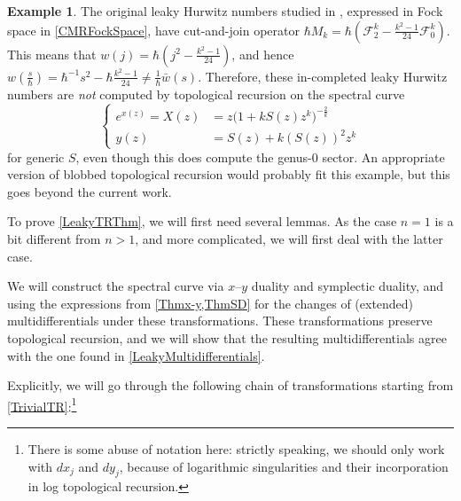 \documentclass[10pt,a4paper,oneside,no-math,reqno]{amsart}%
\theoremstyle{plain}
\theoremstyle{definition}
\newtheorem{example}[theorem]{Example}
\theoremstyle{remark}
\numberwithin{equation}{section}
\newcommand{\mc}[1]{\mathcal{#1}}
\newcommand{\1}{\mathds{1}}
\newcommand{\<}{\langle}
\renewcommand{\>}{\rangle}
\begin{document}
\begin{example}
    The original leaky Hurwitz numbers studied in \cite{CMR25}, expressed in Fock space in \cref{CMRFockSpace}, have cut-and-join operator $ \hbar M_k = \hbar (\mc{F}_2^k - \frac{k^2 - 1}{24} \mc{F}^k_0)$. This means that $ w(j) = \hbar (j^2 - \frac{k^2 -1}{24}) $, and hence $ w(\frac{s}{\hbar}) = \hbar^{-1} s^2 - \hbar \frac{k^2 -1}{24} \neq \frac{1}{\hbar} \bar{w}(s)$. Therefore, these in-completed leaky Hurwitz numbers are \emph{not} computed by topological recursion on the spectral curve
    \begin{equation}
		\begin{cases}
			e^{x(z)}
            =
            X(z)
			&=
			z \big( 1+ k S(z)z^k\big)^{-\frac{2}{k}}
			\\
			y (z)
			&=
			S(z) + k (S(z))^2 z^k
		\end{cases}
	\end{equation}
    for generic $ S$, even though this does compute the genus-$0$ sector. An appropriate version of blobbed topological recursion \cite{BS17,ABDKS25blobbed} would probably fit this example, but this goes beyond the current work.
\end{example}

To prove \cref{LeakyTRThm}, we will first need several lemmas. As the case $ n = 1$ is a bit different from $ n > 1$, and more complicated, we will first deal with the latter case.

We will construct the spectral curve via $x$--$y$ duality and symplectic duality, and using the expressions from \cref{Thmx-y,ThmSD} for the changes of (extended) multidifferentials under these transformations. These transformations preserve topological recursion, and we will show that the resulting multidifferentials agree with the one found in \cref{LeakyMultidifferentials}.

Explicitly, we will go through the following chain of transformations starting from \cref{TrivialTR}:\footnote{There is some abuse of notation here: strictly speaking, we should only work with $ dx_j$ and $ dy_j$, because of logarithmic singularities and their incorporation in log topological recursion.}
\end{document}
